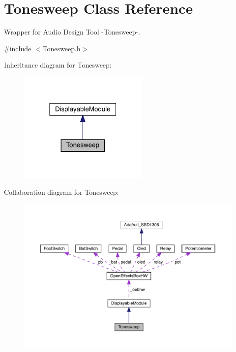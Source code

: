 \hypertarget{class_tonesweep}{}\section{Tonesweep Class Reference}
\label{class_tonesweep}


Wrapper for Audio Design Tool -\/\+Tonesweep-\/.  




{\ttfamily \#include $<$Tonesweep.\+h$>$}



Inheritance diagram for Tonesweep\+:
\nopagebreak
\begin{figure}[H]
\begin{center}
\leavevmode
\includegraphics[width=180pt]{class_tonesweep__inherit__graph}
\end{center}
\end{figure}


Collaboration diagram for Tonesweep\+:
\nopagebreak
\begin{figure}[H]
\begin{center}
\leavevmode
\includegraphics[width=350pt]{class_tonesweep__coll__graph}
\end{center}
\end{figure}
